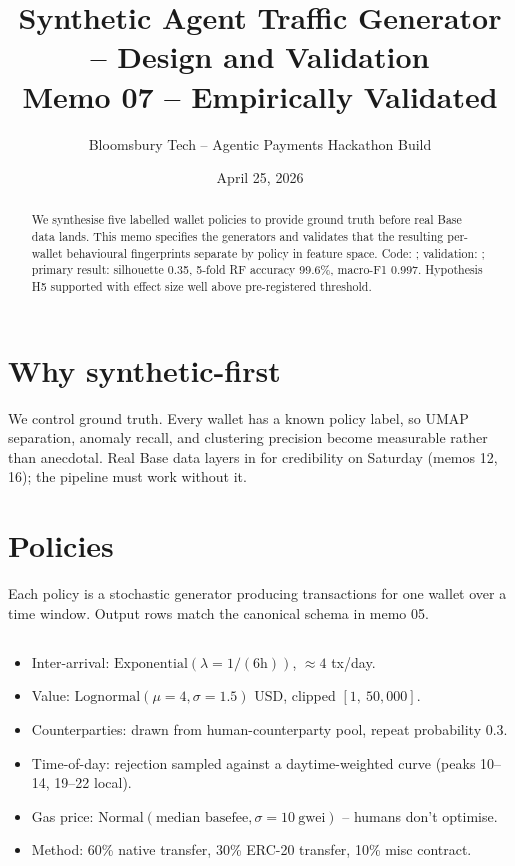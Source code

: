 \documentclass[11pt]{article}
\title{\textbf{Synthetic Agent Traffic Generator -- Design and Validation}\\
\large Memo 07 -- Empirically Validated}
\author{Bloomsbury Tech -- Agentic Payments Hackathon Build}
\date{April 25, 2026}
\begin{document}
\maketitle

\begin{abstract}
We synthesise five labelled wallet policies to provide ground truth before
real Base data lands. This memo specifies the generators and validates that
the resulting per-wallet behavioural fingerprints separate by policy in
feature space. Code: ; validation:
; primary result: silhouette
0.35, 5-fold RF accuracy 99.6\%, macro-F1 0.997. Hypothesis H5 supported
with effect size well above pre-registered threshold.
\end{abstract}

\section{Why synthetic-first}

We control ground truth. Every wallet has a known policy label, so UMAP
separation, anomaly recall, and clustering precision become measurable
rather than anecdotal. Real Base data layers in for credibility on Saturday
(memos 12, 16); the pipeline must work without it.

\section{Policies}

Each policy is a stochastic generator producing transactions for one wallet
over a time window. Output rows match the canonical schema in memo 05.

\subsection*{}
\begin{itemize}
  \item Inter-arrival: $\mathrm{Exponential}(\lambda = 1/(6\text{h}))$,
    $\approx 4$ tx/day.
  \item Value: $\mathrm{Lognormal}(\mu=4, \sigma=1.5)$ USD, clipped
    $[1,\ 50{,}000]$.
  \item Counterparties: drawn from human-counterparty pool, repeat
    probability 0.3.
  \item Time-of-day: rejection sampled against a daytime-weighted curve
    (peaks 10--14, 19--22 local).
  \item Gas price: $\mathrm{Normal}(\text{median basefee}, \sigma=10\
    \text{gwei})$ -- humans don't optimise.
  \item Method: 60\% native transfer, 30\% ERC-20 transfer, 10\% misc
    contract.
\end{itemize}
\end{document}
